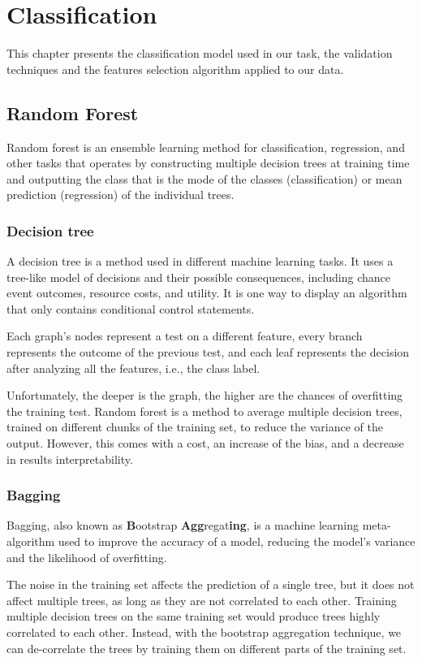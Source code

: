 \chapter{Classification}
This chapter presents the classification model used in our task, the validation techniques and the features selection algorithm applied to our data.
\section{Random Forest}
Random forest is an ensemble learning method for classification, regression, and other tasks that operates by constructing multiple decision trees at training time and outputting the class that is the mode of the classes (classification) or mean prediction (regression) of the individual trees. \cite{ho1995random}
\subsection{Decision tree}
A decision tree is a method used in different machine learning tasks. It uses a tree-like model of decisions and their possible consequences, including chance event outcomes, resource costs, and utility. It is one way to display an algorithm that only contains conditional control statements. \cite{kaminski2018framework}

Each graph's nodes represent a test on a different feature, every branch represents the outcome of the previous test, and each leaf represents the decision after analyzing all the features, i.e., the class label. 

Unfortunately, the deeper is the graph, the higher are the chances of overfitting the training test.
Random forest is a method to average multiple decision trees, trained on different chunks of the training set, to reduce the variance of the output. However, this comes with a cost, an increase of the bias, and a decrease in results interpretability. \cite{hastie2009elements}
\subsection{Bagging}

Bagging, also known as \textbf{B}ootstrap \textbf{Agg}regat\textbf{ing}, is a machine learning meta-algorithm used to improve the accuracy of a model, reducing the model's variance and the likelihood of overfitting. 

The noise in the training set affects the prediction of a single tree, but it does not affect multiple trees, as long as they are not correlated to each other. Training multiple decision trees on the same training set would produce trees highly correlated to each other. Instead, with the bootstrap aggregation technique, we can de-correlate the trees by training them on different parts of the training set. \cite{breiman1996bagging}

